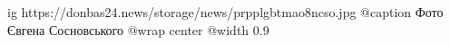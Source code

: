  
 
 
 
 

\ifcmt
  ig https://donbas24.news/storage/news/prpplgbtmao8ncso.jpg
	@caption Фото Євгена Сосновського
  @wrap center
  @width 0.9
\fi
